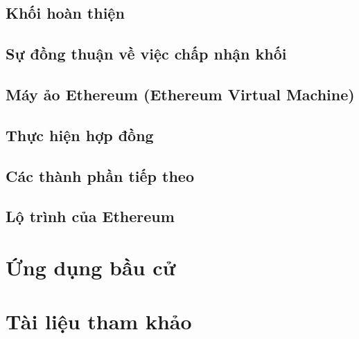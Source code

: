 \documentclass[12pt]{article}
\begin{document}
	\subsection{Khối hoàn thiện}
	
	
	\subsection{Sự đồng thuận về việc chấp nhận khối}
	

	\subsection{Máy ảo Ethereum (Ethereum Virtual Machine)}
	
	
	\subsection{Thực hiện hợp đồng}
	
	
	\subsection{Các thành phần tiếp theo}
	
	
	\subsection{Lộ trình của Ethereum}
	
		
	\section{Ứng dụng bầu cử}
	
	
	\section{Tài liệu tham khảo}
	
\end{document}
